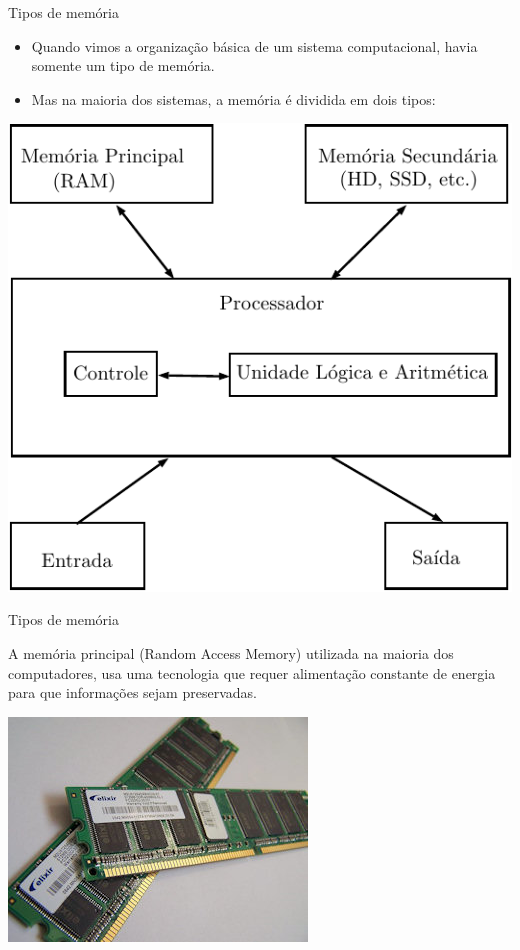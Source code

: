 \documentclass[handout]{beamer}
\begin{document}
\begin{frame}{Tipos de memória}

    \begin{itemize}
        \item Quando vimos a organização básica de um sistema computacional, havia
        somente um tipo de memória.
        \item Mas na maioria dos sistemas, a memória é dividida em dois tipos:
    \end{itemize}
    \vspace{-1em}
    \begin{center}
        \includegraphics[scale=0.7]{organizacao}
    \end{center}

\end{frame}

\begin{frame}{Tipos de memória}

    A memória principal (Random Access Memory) utilizada na maioria dos
    computadores, usa uma tecnologia que requer alimentação constante de
    energia para que informações sejam preservadas.

    \begin{center}
        \includegraphics[scale=0.7]{ram}
    \end{center}

\end{frame}
\end{document}
